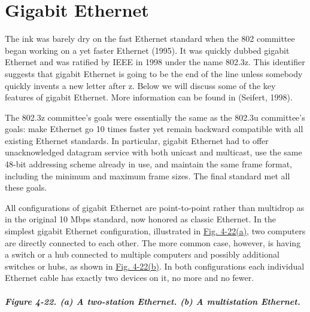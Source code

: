 \section{Gigabit Ethernet}

The ink was barely dry on the fast Ethernet standard when the 802
committee began working on a yet faster Ethernet (1995). It was quickly
dubbed {gigabit Ethernet} and was ratified by IEEE in 1998 under the
name 802.3z. This identifier suggests that gigabit Ethernet is going to
be the end of the line unless somebody quickly invents a new letter
after z. Below we will discuss some of the key features of gigabit
Ethernet. More information can be found in (Seifert, 1998).

The 802.3z committee's goals were essentially the same as the 802.3u
committee's goals: make Ethernet go 10 times faster yet remain backward
compatible with all existing Ethernet standards. In particular, gigabit
Ethernet had to offer unacknowledged datagram service with both unicast
and multicast, use the same 48-bit addressing scheme already in use, and
maintain the same frame format, including the minimum and maximum frame
sizes. The final standard met all these goals.

All configurations of gigabit Ethernet are point-to-point rather than
multidrop as in the original 10 Mbps standard, now honored as {classic
Ethernet}. In the simplest gigabit Ethernet configuration, illustrated
in
\protect\hyperlink{0130661023_ch04lev1sec3.htmlux5cux23ch04fig22}{Fig.
4-22(a)}, two computers are directly connected to each other. The more
common case, however, is having a switch or a hub connected to multiple
computers and possibly additional switches or hubs, as shown in
\protect\hyperlink{0130661023_ch04lev1sec3.htmlux5cux23ch04fig22}{Fig.
4-22(b)}. In both configurations each individual Ethernet cable has
exactly two devices on it, no more and no fewer.

\subparagraph[Figure 4-22. (a) A two-station Ethernet. (b) A
multistation
Ethernet.]{\texorpdfstring{\protect\hypertarget{0130661023_ch04lev1sec3.htmlux5cux23ch04fig22}{}{}Figure
4-22. (a) A two-station Ethernet. (b) A multistation
Ethernet.}{Figure 4-22. (a) A two-station Ethernet. (b) A multistation Ethernet.}}


